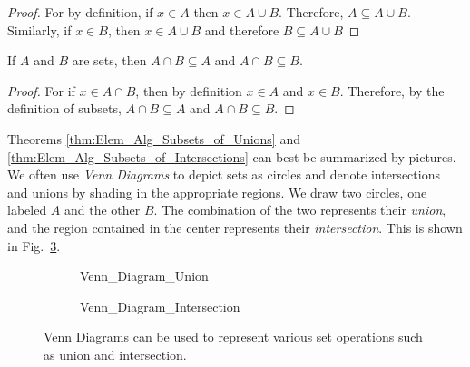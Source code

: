 \documentclass[crop=false,class=book,oneside]{standalone}                      %
\begin{document}
            \begin{proof}
                For by definition, if $x\in{A}$ then
                $x\in{A}\cup{B}$. Therefore,
                $A\subseteq{A}\cup{B}$.
                Similarly, if $x\in{B}$, then
                $x\in{A}\cup{B}$ and therefore
                $B\subseteq{A}\cup{B}$
            \end{proof}
            \begin{theorem}
                \label{thm:Elem_Alg_Subsets_of_Intersections}
                If $A$ and $B$ are sets, then
                $A\cap{B}\subseteq{A}$ and
                $A\cap{B}\subseteq{B}$.
            \end{theorem}
            \begin{proof}
                For if $x\in{A}\cap{B}$, then by definition
                $x\in{A}$ and $x\in{B}$.
                Therefore, by the definition of subsets,
                ${A}\cap{B}\subseteq{A}$ and
                ${A}\cap{B}\subseteq{B}$.
            \end{proof}
            Theorems \ref{thm:Elem_Alg_Subsets_of_Unions}
            and \ref{thm:Elem_Alg_Subsets_of_Intersections}
            can best be summarized by pictures. We often use
            \textit{Venn Diagrams} to depict sets as circles
            and denote intersections and unions by shading
            in the appropriate regions. We draw two circles,
            one labeled $A$ and the other $B$. The combination
            of the two represents their \textit{union},
            and the region contained in the center
            represents their \textit{intersection}.
            This is shown in Fig.~\ref{fig:Elem_Alg_Venn_Diagram}.
            \begin{figure}[H]
                \captionsetup{type=figure}
                \centering
                \begin{subfigure}[b]{0.49\textwidth}
                    \captionsetup{type=figure}
                    \centering
                    {Venn_Diagram_Union}
                    \label{fig:Elem_Alg_Union_Venn_Diagram}
                \end{subfigure}
                \begin{subfigure}[b]{0.49\textwidth}
                    \captionsetup{type=figure}
                    \centering
                    {Venn_Diagram_Intersection}
                    \label{fig:Elem_Alg_Intersection_Venn_diagram}
                \end{subfigure}
                \caption[Venn Diagrams for Union and Intersection]
                        {Venn Diagrams can be used to represent
                         various set operations such as union
                         and intersection.}
                \label{fig:Elem_Alg_Venn_Diagram}
            \end{figure}
\end{document}

